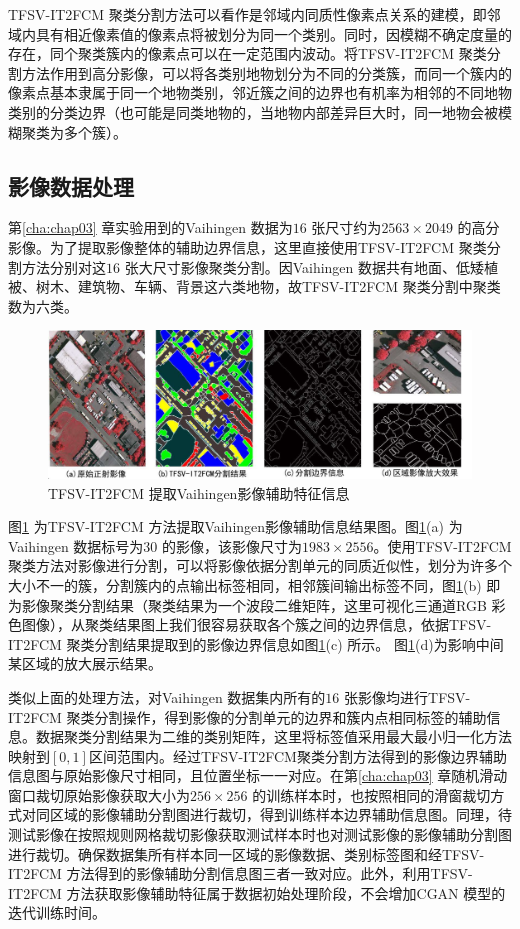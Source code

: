 TFSV-IT2FCM 聚类分割方法可以看作是邻域内同质性像素点关系的建模，即邻域内具有相近像素值的像素点将被划分为同一个类别。同时，因模糊不确定度量的存在，同个聚类簇内的像素点可以在一定范围内波动。将TFSV-IT2FCM 聚类分割方法作用到高分影像，可以将各类别地物划分为不同的分类簇，而同一个簇内的像素点基本隶属于同一个地物类别，邻近簇之间的边界也有机率为相邻的不同地物类别的分类边界（也可能是同类地物的，当地物内部差异巨大时，同一地物会被模糊聚类为多个簇）。

\subsection{影像数据处理}
\label{subsec:chap04-2-2}
第\ref{cha:chap03} 章实验用到的Vaihingen 数据为$16$ 张尺寸约为$ 2563 \times 2049$ 的高分影像。为了提取影像整体的辅助边界信息，这里直接使用TFSV-IT2FCM 聚类分割方法分别对这$16$ 张大尺寸影像聚类分割。因Vaihingen 数据共有地面、低矮植被、树木、建筑物、车辆、背景这六类地物，故TFSV-IT2FCM 聚类分割中聚类数为六类。

\begin{figure}[!h]
    \centering
    \includegraphics[width=1.0\textwidth]{figures/tfsv_seg}
    \caption{TFSV-IT2FCM 提取Vaihingen影像辅助特征信息}
    \label{fig:tfsv_seg}
\end{figure}

图\ref{fig:tfsv_seg} 为TFSV-IT2FCM 方法提取Vaihingen影像辅助信息结果图。图\ref{fig:tfsv_seg}(a) 为Vaihingen 数据标号为$30$ 的影像，该影像尺寸为$1983\times2556$。使用TFSV-IT2FCM 聚类方法对影像进行分割，可以将影像依据分割单元的同质近似性，划分为许多个大小不一的簇，分割簇内的点输出标签相同，相邻簇间输出标签不同，图\ref{fig:tfsv_seg}(b) 即为影像聚类分割结果（聚类结果为一个波段二维矩阵，这里可视化三通道RGB 彩色图像），从聚类结果图上我们很容易获取各个簇之间的边界信息，依据TFSV-IT2FCM 聚类分割结果提取到的影像边界信息如图\ref{fig:tfsv_seg}(c) 所示。 图\ref{fig:tfsv_seg}(d)为影响中间某区域的放大展示结果。

类似上面的处理方法，对Vaihingen 数据集内所有的$16$ 张影像均进行TFSV-IT2FCM 聚类分割操作，得到影像的分割单元的边界和簇内点相同标签的辅助信息。数据聚类分割结果为二维的类别矩阵，这里将标签值采用最大最小归一化方法映射到$[0,1]$区间范围内。经过TFSV-IT2FCM聚类分割方法得到的影像边界辅助信息图与原始影像尺寸相同，且位置坐标一一对应。在第\ref{cha:chap03} 章随机滑动窗口裁切原始影像获取大小为$256\times 256$ 的训练样本时，也按照相同的滑窗裁切方式对同区域的影像辅助分割图进行裁切，得到训练样本边界辅助信息图。同理，待测试影像在按照规则网格裁切影像获取测试样本时也对测试影像的影像辅助分割图进行裁切。确保数据集所有样本同一区域的影像数据、类别标签图和经TFSV-IT2FCM 方法得到的影像辅助分割信息图三者一致对应。此外，利用TFSV-IT2FCM 方法获取影像辅助特征属于数据初始处理阶段，不会增加CGAN 模型的迭代训练时间。


